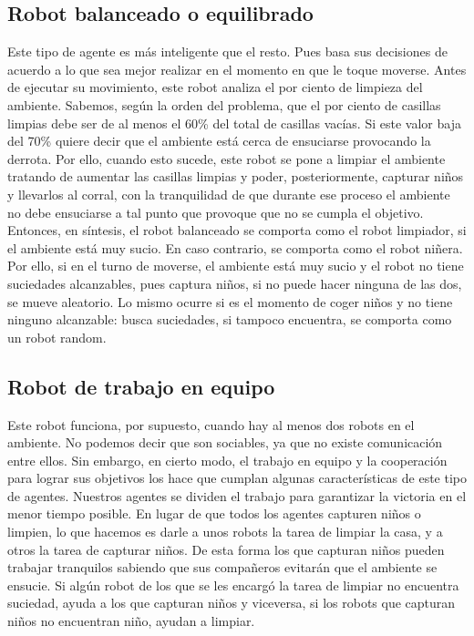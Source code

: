 \documentclass[twoside]{article}
\begin{document}
\subsection{Robot balanceado o equilibrado}
Este tipo de agente es m\'as inteligente que el resto. Pues basa sus decisiones de acuerdo a lo que sea mejor realizar en el momento en que le toque moverse. Antes de ejecutar su movimiento, este robot analiza el por ciento de limpieza del ambiente. Sabemos, seg\'un la orden del problema, que el por ciento de casillas limpias debe ser de al menos el 60\% del total de casillas vac\'ias. Si este valor baja del 70\% quiere decir que el ambiente est\'a cerca de ensuciarse provocando la derrota. Por ello, cuando esto sucede, este robot se pone a limpiar el ambiente tratando de aumentar las casillas limpias y poder, posteriormente, capturar ni\~nos y llevarlos al corral, con la tranquilidad de que durante ese proceso el ambiente no debe ensuciarse a tal punto que provoque que no se cumpla el objetivo. Entonces, en s\'intesis, el robot balanceado se comporta como el robot limpiador, si el ambiente est\'a muy sucio. En caso contrario, se comporta como el robot ni\~nera. Por ello, si en el turno de moverse, el ambiente est\'a muy sucio y el robot no tiene suciedades alcanzables, pues captura ni\~nos, si no puede hacer ninguna de las dos, se mueve aleatorio. Lo mismo ocurre si es el momento de coger ni\~nos y no tiene ninguno alcanzable: busca suciedades, si tampoco 
encuentra, se comporta como un robot random. 

\subsection{Robot de trabajo en equipo} 
Este robot funciona, por supuesto, cuando hay al menos dos robots en el ambiente. No podemos decir que son sociables, ya que no existe comunicaci\'on entre ellos. Sin embargo, en cierto modo, el trabajo en equipo y la cooperaci\'on para lograr sus objetivos los hace que cumplan algunas caracter\'isticas de este tipo de agentes. Nuestros agentes se dividen el trabajo para garantizar la victoria en el menor tiempo posible. En lugar de que todos los agentes capturen ni\~nos o limpien, lo que hacemos es darle a unos robots la tarea de limpiar la casa, y a otros la tarea de capturar ni\~nos. De esta forma los que capturan ni\~nos pueden trabajar tranquilos sabiendo que sus compa\~neros evitar\'an que el ambiente se ensucie. Si alg\'un robot de los que se les encarg\'o la tarea de limpiar no encuentra suciedad, ayuda a los que capturan ni\~nos y viceversa, si los robots que capturan ni\~nos no encuentran ni\~no, ayudan a limpiar.\\\\
\end{document}
